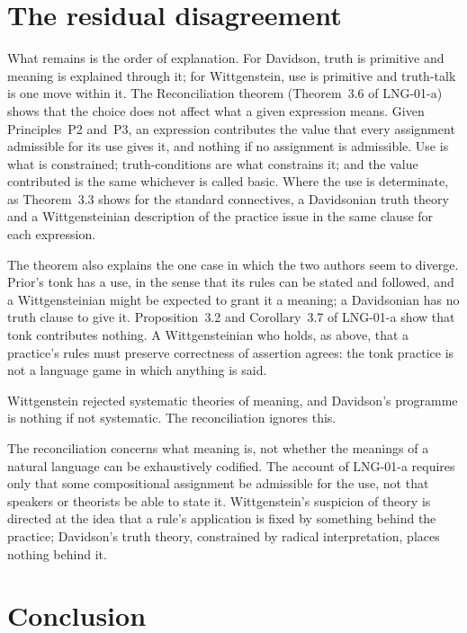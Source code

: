 \documentclass{situationist-preprint}
\begin{document}
\section{The residual disagreement}

What remains is the order of explanation. For Davidson, truth is primitive and meaning is explained through it; for Wittgenstein, use is primitive and truth-talk is one move within it. The Reconciliation theorem (Theorem~3.6 of LNG-01-a) shows that the choice does not affect what a given expression means. Given Principles~P2 and~P3, an expression contributes the value that every assignment admissible for its use gives it, and nothing if no assignment is admissible. Use is what is constrained; truth-conditions are what constrains it; and the value contributed is the same whichever is called basic. Where the use is determinate, as Theorem~3.3 shows for the standard connectives, a Davidsonian truth theory and a Wittgensteinian description of the practice issue in the same clause for each expression.

The theorem also explains the one case in which the two authors seem to diverge. Prior's tonk has a use, in the sense that its rules can be stated and followed, and a Wittgensteinian might be expected to grant it a meaning; a Davidsonian has no truth clause to give it. Proposition~3.2 and Corollary~3.7 of LNG-01-a show that tonk contributes nothing. A Wittgensteinian who holds, as above, that a practice's rules must preserve correctness of assertion agrees: the tonk practice is not a language game in which anything is said.

\begin{objection}
Wittgenstein rejected systematic theories of meaning, and Davidson's programme is nothing if not systematic. The reconciliation ignores this.
\end{objection}

\begin{reply}
The reconciliation concerns what meaning is, not whether the meanings of a natural language can be exhaustively codified. The account of LNG-01-a requires only that some compositional assignment be admissible for the use, not that speakers or theorists be able to state it. Wittgenstein's suspicion of theory is directed at the idea that a rule's application is fixed by something behind the practice; Davidson's truth theory, constrained by radical interpretation, places nothing behind it.
\end{reply}

\section{Conclusion}
\end{document}

